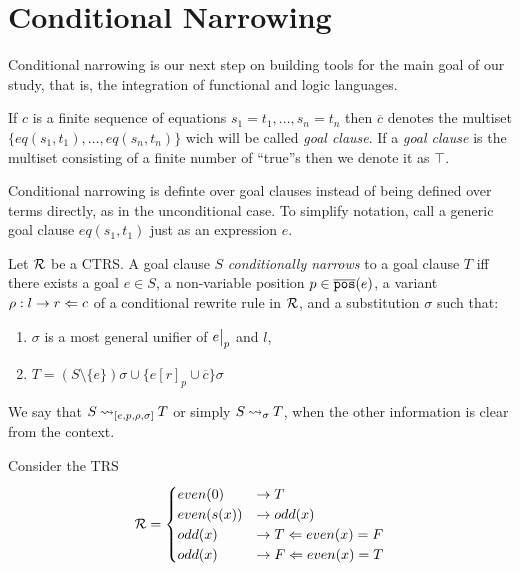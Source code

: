 \section{Conditional Narrowing}
Conditional narrowing is our next step on building tools for the main goal of our study, that is, the integration of functional and logic languages.

\begin{definition}
	If $c$ is a finite sequence of equations $s_1 = t_1, \dots, s_n = t_n$ then $\overline{c}$ denotes the multiset $\{ eq(s_1, t_1), \dots, eq(s_n, t_n) \}$ wich will be called \textit{goal clause}. If a \textit{goal clause} is the multiset consisting of a finite number of ``true''s then we denote it as $\top$.
\end{definition}

Conditional narrowing is definte over goal clauses instead of being defined over terms directly, as in the unconditional case. To simplify notation, call a generic goal clause $eq(s_1, t_1)$ just as an expression $e$.

\begin{definition}
	Let $\mathcal{R}$ be a CTRS. A goal clause $S$ \textit{conditionally narrows} to a goal clause $T$ iff there exists a goal $e \in S$, a non-variable position $p \in \overline{\mathtt{pos}}(e)$, a variant $\rho : l \rightarrow r \Leftarrow c$ of a conditional rewrite rule in $\mathcal{R}$, and a substitution $\sigma$ such that:
	\begin{enumerate}
		\item $\sigma$ is a most general unifier of $\restr{e}{p}$ and $l$,
		\item $T = (S \setminus \{e\})\sigma \cup \{ e[r]_p \cup \overline{c} \}\sigma$
	\end{enumerate}
	We say that $S \mathbin{\rightsquigarrow}_{[e, p, \rho, \sigma]} T$ or simply $S \mathbin{\rightsquigarrow}_\sigma T$, when the other information is clear from the context.
\end{definition}

\begin{example}
	Consider the TRS
	\begin{displaymath}
		\mathcal{R} =
		\begin{cases}
			even(0)    & \rightarrow T                        \\
			even(s(x)) & \rightarrow odd(x)                   \\
			odd(x)     & \rightarrow T \Leftarrow even(x) = F \\
			odd(x)     & \rightarrow F \Leftarrow even(x) = T
		\end{cases}
	\end{displaymath}
\end{example}

